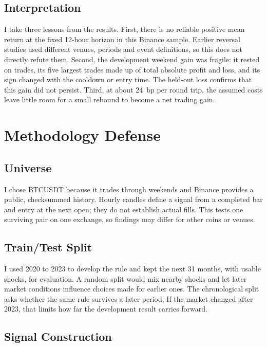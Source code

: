 \documentclass[11pt,a4paper]{article}
\begin{document}
\subsection{Interpretation}

I take three lessons from the results. First, there is no reliable positive mean return at the fixed 12-hour horizon in this Binance sample. Earlier reversal studies used different venues, periods and event definitions, so this does not directly refute them. Second, the development weekend gain was fragile: it rested on \DevWeekendTrades{} trades, its five largest trades made up \DevWeekendTopFiveShare{} of total absolute profit and loss, and its sign changed with the cooldown or entry time. The held-out loss confirms that this gain did not persist. Third, at about 24~bp per round trip, the assumed costs leave little room for a small rebound to become a net trading gain.

\section{Methodology Defense}

\subsection{Universe}

I chose BTCUSDT because it trades through weekends and Binance provides a public, checksummed history. Hourly candles define a signal from a completed bar and entry at the next open; they do not establish actual fills. This tests one surviving pair on one exchange, so findings may differ for other coins or venues.

\subsection{Train/Test Split}

I used 2020 to 2023 to develop the rule and kept the next 31 months, with \HoSampleHOneN{} usable shocks, for evaluation. A random split would mix nearby shocks and let later market conditions influence choices made for earlier ones. The chronological split asks whether the same rule survives a later period. If the market changed after 2023, that limits how far the development result carries forward.

\subsection{Signal Construction}
\end{document}

